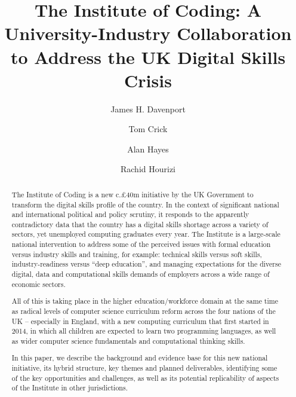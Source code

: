 \documentclass[sigconf]{acmart}
\begin{document}
\title{The Institute of Coding: A University-Industry Collaboration to Address the UK Digital Skills Crisis}

\author{James H. Davenport}

\author{Tom Crick}

\author{Alan Hayes}

\author{Rachid Hourizi}

 
\renewcommand{\shortauthors}{Davenport, Crick, Hayes and Hourizi}


\begin{abstract}
The Institute of Coding is a new c.\pounds40m initiative by the UK
Government to transform the digital skills profile of the country. In
the context of significant national and international political and
policy scrutiny, it responds to the apparently contradictory data that
the country has a digital skills shortage across a variety of sectors,
yet unemployed computing graduates every year. The Institute is a
large-scale national intervention to address some of the perceived
issues with formal education versus industry skills and training, for
example: technical skills versus soft skills, industry-readiness
versus ``deep education'', and managing expectations for the diverse
digital, data and computational skills demands of employers across a
wide range of economic sectors.

All of this is taking place in the higher education/workforce domain
at the same time as radical levels of computer science curriculum
reform across the four nations of the UK -- especially in England,
with a new computing curriculum that first started in 2014, in which
all children are expected to learn two programming languages, as well
as wider computer science fundamentals and computational thinking
skills.

In this paper, we describe the background and evidence base for this
new national initiative, its hybrid structure, key themes and planned
deliverables, identifying some of the key opportunities and
challenges, as well as its potential replicability of aspects of the
Institute in other jurisdictions.
\end{abstract}
\end{document}
